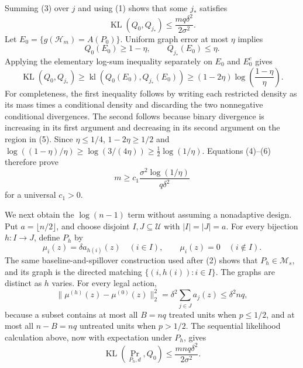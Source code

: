 Summing (3) over \(j\) and using (1) shows that some \(j_*\) satisfies
\[
 \operatorname{KL}(Q_0,Q_{j_*})\le \frac{mq\delta^2}{2\sigma^2}. \tag{4}
\]
Let \(E_0=\{g(\mathscr H_m)=A(P_0)\}\).  Uniform graph error at most \(\eta\) implies
\[
 Q_0(E_0)\ge1-\eta,
 \qquad Q_{j_*}(E_0)\le\eta. \tag{5}
\]
Applying the elementary log-sum inequality separately on \(E_0\) and \(E_0^c\) gives
\[
 \operatorname{KL}(Q_0,Q_{j_*})
 \ge \operatorname{kl}(Q_0(E_0),Q_{j_*}(E_0))
 \ge (1-2\eta)\log\!\left(\frac{1-\eta}{\eta}\right). \tag{6}
\]
For completeness, the first inequality follows by writing each restricted density as its mass times a conditional density and discarding the two nonnegative conditional divergences.  The second follows because binary divergence is increasing in its first argument and decreasing in its second argument on the region in (5).  Since \(\eta\le1/4\), \(1-2\eta\ge1/2\) and
\(\log((1-\eta)/\eta)\ge\log(3/(4\eta))\ge\frac12\log(1/\eta)\).  Equations (4)--(6) therefore prove
\[
 m\ge c_1\frac{\sigma^2\log(1/\eta)}{q\delta^2} \tag{7}
\]
for a universal \(c_1>0\).

We next obtain the \(\log(n-1)\) term without assuming a nonadaptive design.  Put \(a=\lfloor n/2\rfloor\), and choose disjoint \(I,J\subseteq\mathcal U\) with \(|I|=|J|=a\).  For every bijection \(h:I\to J\), define \(P_h\) by
\[
 \mu_i(z)=\delta a_{h(i)}(z)\quad(i\in I),
 \qquad \mu_i(z)=0\quad(i\notin I). \tag{8}
\]
The same baseline-and-spillover construction used after (2) shows that \(P_h\in\mathcal M_s\), and its graph is the directed matching \(\{(i,h(i)):i\in I\}\).  The graphs are distinct as \(h\) varies.  For every legal action,
\[
 \lVert\mu^{(h)}(z)-\mu^{(0)}(z)\rVert_2^2
 =\delta^2\sum_{j\in J}a_j(z)
 \le \delta^2nq, \tag{9}
\]
because a subset contains at most all \(B=nq\) treated units when \(p\le1/2\), and at most all \(n-B=nq\) untreated units when \(p>1/2\).  The sequential likelihood calculation above, now with expectation under \(P_h\), gives
\[
 \operatorname{KL}(\Pr_{P_h,d},Q_0)
 \le\frac{mnq\delta^2}{2\sigma^2}. \tag{10}
\]


